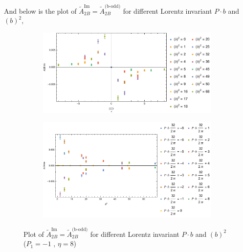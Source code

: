 \documentclass[]{article}
\numberwithin{equation}{section}
\newcommand{\tAmp}{\widetilde{A}}
\newcommand{\tAmp}{\ensuremath{\widetilde{A}^{(+)}}}
\begin{document}
\pagebreak

And below is the plot of $\tAmp^{\text{Im}}_{2B}=\tAmp^{\text{(b-odd)}}_{2B}$ for different Lorentz invariant $P\cdot b$ and $(b)^2$,
\begin{figure}[h!]
     \centering
     \begin{subfigure}[b]{0.45\textwidth}
         \centering
         \includegraphics[width=\textwidth]{bP_A2B_b_odd_P1_-1_eta_8.pdf}
     \end{subfigure}
     \begin{subfigure}[b]{0.45\textwidth}
         \centering
         \includegraphics[width=\textwidth]{bsq_A2B_b_odd_P1_-1_eta_8.pdf}
     \end{subfigure}
        \caption{Plot of $\tAmp^{\text{Im}}_{2B}=\tAmp^{\text{(b-odd)}}_{2B}$ for different Lorentz invariant $P\cdot b$ and $(b)^2$  ($P_{1} = -1$ , $\eta=8$)}
\end{figure}
\end{document}
